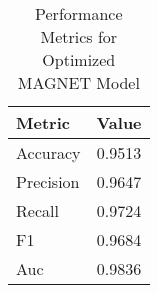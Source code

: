 \begin{table}[h]
\centering
\caption{Performance Metrics for Optimized MAGNET Model}
\label{tab:performance_metrics}
\begin{tabular}{lc}
\toprule
Metric & Value \\
\midrule
Accuracy & 0.9513 \\
Precision & 0.9647 \\
Recall & 0.9724 \\
F1 & 0.9684 \\
Auc & 0.9836 \\
\bottomrule
\end{tabular}
\end{table}
